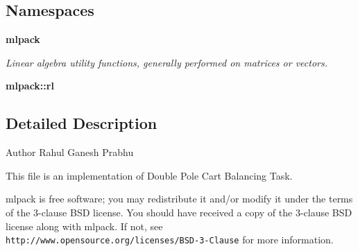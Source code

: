 \subsection*{Namespaces}
\begin{DoxyCompactItemize}
\item 
 \textbf{ mlpack}
\begin{DoxyCompactList}\small\item\em Linear algebra utility functions, generally performed on matrices or vectors. \end{DoxyCompactList}\item 
 \textbf{ mlpack\+::rl}
\end{DoxyCompactItemize}


\subsection{Detailed Description}
\begin{DoxyAuthor}{Author}
Rahul Ganesh Prabhu
\end{DoxyAuthor}
This file is an implementation of Double Pole Cart Balancing Task.

mlpack is free software; you may redistribute it and/or modify it under the terms of the 3-\/clause B\+SD license. You should have received a copy of the 3-\/clause B\+SD license along with mlpack. If not, see {\tt http\+://www.\+opensource.\+org/licenses/\+B\+S\+D-\/3-\/\+Clause} for more information. 